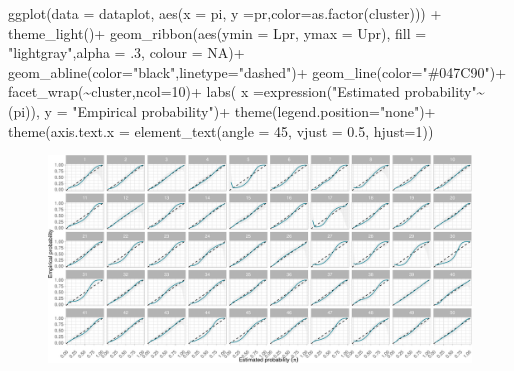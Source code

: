 \documentclass[
  letterpaper,
  DIV=11,
  numbers=noendperiod]{scrartcl}
\newenvironment{Shaded}{\begin{snugshade}}{\end{snugshade}}
\newcommand{\AttributeTok}[1]{\textcolor[rgb]{0.65,0.35,0.00}{#1}}
\newcommand{\ConstantTok}[1]{\textcolor[rgb]{0.85,0.12,0.09}{#1}}
\newcommand{\DecValTok}[1]{\textcolor[rgb]{0.47,0.16,0.63}{#1}}
\newcommand{\FloatTok}[1]{\textcolor[rgb]{0.65,0.35,0.00}{#1}}
\newcommand{\FunctionTok}[1]{\textcolor[rgb]{0.02,0.16,0.49}{#1}}
\newcommand{\NormalTok}[1]{\textcolor[rgb]{0.33,0.33,0.33}{#1}}
\newcommand{\SpecialCharTok}[1]{\textcolor[rgb]{0.00,0.46,0.62}{#1}}
\newcommand{\StringTok}[1]{\textcolor[rgb]{0.00,0.50,0.00}{#1}}
\begin{document}
\begin{Shaded}
\begin{Highlighting}[]
\FunctionTok{ggplot}\NormalTok{(}\AttributeTok{data =}\NormalTok{ dataplot, }\FunctionTok{aes}\NormalTok{(}\AttributeTok{x =}\NormalTok{ pi, }\AttributeTok{y =}\NormalTok{pr,}\AttributeTok{color=}\FunctionTok{as.factor}\NormalTok{(cluster))) }\SpecialCharTok{+}
  \FunctionTok{theme\_light}\NormalTok{()}\SpecialCharTok{+}
  \FunctionTok{geom\_ribbon}\NormalTok{(}\FunctionTok{aes}\NormalTok{(}\AttributeTok{ymin =}\NormalTok{ Lpr, }\AttributeTok{ymax =}\NormalTok{ Upr), }\AttributeTok{fill =} \StringTok{"lightgray"}\NormalTok{,}\AttributeTok{alpha =}\NormalTok{ .}\DecValTok{3}\NormalTok{, }\AttributeTok{colour =} \ConstantTok{NA}\NormalTok{)}\SpecialCharTok{+} 
  \FunctionTok{geom\_abline}\NormalTok{(}\AttributeTok{color=}\StringTok{"black"}\NormalTok{,}\AttributeTok{linetype=}\StringTok{"dashed"}\NormalTok{)}\SpecialCharTok{+}
  \FunctionTok{geom\_line}\NormalTok{(}\AttributeTok{color=}\StringTok{"\#047C90"}\NormalTok{)}\SpecialCharTok{+}
  \FunctionTok{facet\_wrap}\NormalTok{(}\SpecialCharTok{\textasciitilde{}}\NormalTok{cluster,}\AttributeTok{ncol=}\DecValTok{10}\NormalTok{)}\SpecialCharTok{+}
  \FunctionTok{labs}\NormalTok{( }\AttributeTok{x =}\FunctionTok{expression}\NormalTok{(}\StringTok{"Estimated probability"}\SpecialCharTok{\textasciitilde{}}\NormalTok{(pi)),}
        \AttributeTok{y =} \StringTok{"Empirical probability"}\NormalTok{)}\SpecialCharTok{+}
  \FunctionTok{theme}\NormalTok{(}\AttributeTok{legend.position=}\StringTok{"none"}\NormalTok{)}\SpecialCharTok{+}
  \FunctionTok{theme}\NormalTok{(}\AttributeTok{axis.text.x =} \FunctionTok{element\_text}\NormalTok{(}\AttributeTok{angle =} \DecValTok{45}\NormalTok{, }\AttributeTok{vjust =} \FloatTok{0.5}\NormalTok{, }\AttributeTok{hjust=}\DecValTok{1}\NormalTok{))}
\end{Highlighting}
\end{Shaded}

\begin{figure}[H]

{\centering \includegraphics{index_files/figure-pdf/unnamed-chunk-2-1.pdf}

}

\end{figure}
\end{document}
